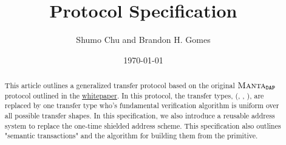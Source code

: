 \documentclass[a4paper]{article}
\title{\MantaPay{} Protocol Specification}
\author{Shumo Chu and Brandon H. Gomes}
\date{\today}
\begin{document}
    
\maketitle

\begin{abstract}
    This article outlines a generalized transfer protocol based on the original ${{\textsc{Manta}}{}_{\texttt{DAP}}}$ protocol outlined in the \href{https://eprint.iacr.org/2021/743.pdf}{\Manta{} whitepaper}. In this protocol, the \Manta{} transfer types, (\Mint{}, \PrivateTransfer{}, \Reclaim{}), are replaced by one transfer type \Transfer{} who's fundamental verification algorithm is uniform over all possible transfer shapes. In this specification, we also introduce a reusable address system to replace the one-time shielded address scheme. This specification also outlines "semantic transactions" and the algorithm for building them from the \Transfer{} primitive.
\end{abstract}
    
\tableofcontents
\end{document}
